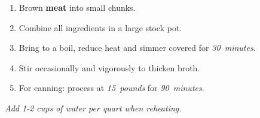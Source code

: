 \documentclass[11pt,letterpaper]{article}
\begin{document}
\begin{enumerate}
    \item Brown \textbf{meat} into small chunks.
    \item Combine all ingredients in a large stock pot.
    \item Bring to a boil, reduce heat and simmer covered for \textit{30~minutes}.
    \item Stir occasionally and vigorously to thicken broth.
    \item For canning: process at \textit{15~pounds} for \textit{90~minutes}.
\end{enumerate}

\noindent
\textit{Add 1-2 cups of water per quart when reheating.}
\end{document}

